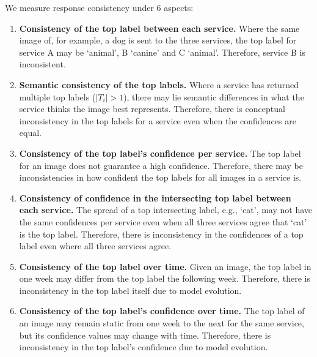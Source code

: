 We measure response consistency under 6 aspects:


\begin{enumerate}[label=\textbf{(\arabic*)}]
  \item \textbf{Consistency of the top label between each service.} Where the same image of, for example, a dog is sent to the three services, the top label for service A may be `animal', B `canine' and C `animal'. Therefore, service B is inconsistent.
  \item \textbf{Semantic consistency of the top labels.} Where a service has returned multiple top labels ($| T_{i} | > 1$), there may lie semantic differences in what the service thinks the image best represents. Therefore, there is conceptual inconsistency in the top labels for a service even when the confidences are equal.
  \item \textbf{Consistency of the top label's confidence per service.} The top label for an image does not guarantee a high confidence. Therefore, there may be inconsistencies in how confident the top labels for all images in a service is.
  \item \textbf{Consistency of confidence in the intersecting top label between each service.} The spread of a top intersecting label, e.g., `cat', may not have the same confidences per service even when all three services agree that `cat' is the top label. Therefore, there is inconsistency in the confidences of a top label even where all three services agree.
  \item \textbf{Consistency of the top label over time.} Given an image, the top label in one week may differ from the top label the following week. Therefore, there is inconsistency in the top label itself due to model evolution.
  \item \textbf{Consistency of the top label's confidence over time.} The top label of an image may remain static from one week to the next for the same service, but its confidence values may change with time. Therefore, there is inconsistency in the top label's confidence due to model evolution.
\end{enumerate}

